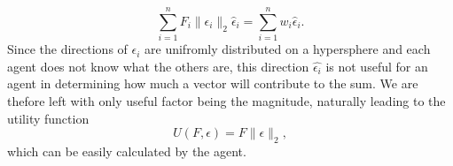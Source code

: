 \begin{equation*}
    \sum^n_{i=1} F_i \|\epsilon_i\|_2 \hat{\epsilon}_i = \sum^n_{i=1} w_i \hat{\epsilon}_i.
\end{equation*}
Since the directions of $\epsilon_i$ are unifromly distributed on a hypersphere \cite{UnfiormProof} and each agent does not know what the others are, this direction $\hat{\epsilon_i}$ is not useful for an agent in determining how much a vector will contribute to the sum. We are thefore left with only useful factor being the magnitude, naturally leading to the utility function
\begin{equation*}
    U(F,\epsilon) = F \|\epsilon\|_2,
\end{equation*}
which can be easily calculated by the agent.





